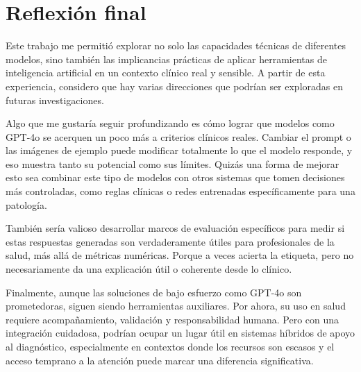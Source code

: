 \chapter*{Reflexión final}

Este trabajo me permitió explorar no solo las capacidades técnicas de diferentes modelos, sino también las implicancias prácticas de aplicar herramientas de inteligencia artificial en un contexto clínico real y sensible. A partir de esta experiencia, considero que hay varias direcciones que podrían ser exploradas en futuras investigaciones.

Algo que me gustaría seguir profundizando es cómo lograr que modelos como GPT-4o se acerquen un poco más a criterios clínicos reales. Cambiar el prompt o las imágenes de ejemplo puede modificar totalmente lo que el modelo responde, y eso muestra tanto su potencial como sus límites. Quizás una forma de mejorar esto sea combinar este tipo de modelos con otros sistemas que tomen decisiones más controladas, como reglas clínicas o redes entrenadas específicamente para una patología.

También sería valioso desarrollar marcos de evaluación específicos para medir si estas respuestas generadas son verdaderamente útiles para profesionales de la salud, más allá de métricas numéricas. Porque a veces acierta la etiqueta, pero no necesariamente da una explicación útil o coherente desde lo clínico.

Finalmente, aunque las soluciones de bajo esfuerzo como GPT-4o son prometedoras, siguen siendo herramientas auxiliares. Por ahora, su uso en salud requiere acompañamiento, validación y responsabilidad humana. Pero con una integración cuidadosa, podrían ocupar un lugar útil en sistemas híbridos de apoyo al diagnóstico, especialmente en contextos donde los recursos son escasos y el acceso temprano a la atención puede marcar una diferencia significativa.